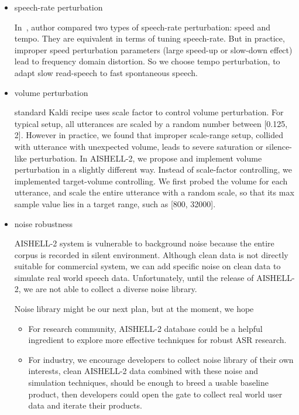 \documentclass[a4paper]{article}
\begin{document}
\begin{itemize}
\item speech-rate perturbation

  In~\cite{tomko}, author compared two types of speech-rate perturbation: speed
  and tempo. They are equivalent in terms of tuning speech-rate. But in
  practice, improper speed perturbation parameters (large speed-up or slow-down
  effect) lead to frequency domain distortion. So we choose tempo perturbation,
  to adapt slow read-speech to fast spontaneous speech.

\item volume perturbation

  standard Kaldi recipe uses scale factor to control volume perturbation. For
  typical setup, all utterances are scaled by a random number between [0.125,
    2]. However in practice, we found that improper scale-range setup, collided
  with utterance with unexpected volume, leads to severe saturation or
  silence-like perturbation. In AISHELL-2, we propose and implement volume
  perturbation in a slightly different way. Instead of scale-factor controlling,
  we implemented target-volume controlling. We first probed the volume for each
  utterance, and scale the entire utterance with a random scale, so that its max
  sample value lies in a target range, such as [800, 32000].

\item noise robustness

  AISHELL-2 system is vulnerable to background noise because the entire corpus
  is recorded in silent environment. Although clean data is not directly
  suitable for commercial system, we can add specific noise on clean data to
  simulate real world speech data. Unfortunately, until the release of
  AISHELL-2, we are not able to collect a diverse noise library.

  Noise library might be our next plan, but at the moment, we hope
  \begin{itemize}
    \item For research community, AISHELL-2 database could be a helpful
      ingredient to explore more effective techniques for robust ASR research.
    \item For industry, we encourage developers to collect noise library of
      their own interests, clean AISHELL-2 data combined with these noise and
      simulation techniques, should be enough to breed a usable baseline
      product, then developers could open the gate to collect real world user
      data and iterate their products.
  \end{itemize}
\end{itemize}
\end{document}
